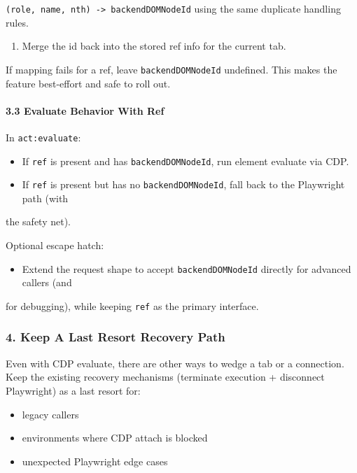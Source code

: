 \texttt{(role, name, nth) -> backendDOMNodeId} using the same duplicate handling rules.
\begin{enumerate}
  \item Merge the id back into the stored ref info for the current tab.
\end{enumerate}


If mapping fails for a ref, leave \texttt{backendDOMNodeId} undefined. This makes the feature
best-effort and safe to roll out.

\paragraph{3.3 Evaluate Behavior With Ref}


In \texttt{act:evaluate}:

\begin{itemize}
  \item If \texttt{ref} is present and has \texttt{backendDOMNodeId}, run element evaluate via CDP.
  \item If \texttt{ref} is present but has no \texttt{backendDOMNodeId}, fall back to the Playwright path (with
\end{itemize}

the safety net).

Optional escape hatch:

\begin{itemize}
  \item Extend the request shape to accept \texttt{backendDOMNodeId} directly for advanced callers (and
\end{itemize}

for debugging), while keeping \texttt{ref} as the primary interface.

\subsubsection{4. Keep A Last Resort Recovery Path}


Even with CDP evaluate, there are other ways to wedge a tab or a connection. Keep the
existing recovery mechanisms (terminate execution + disconnect Playwright) as a last resort
for:

\begin{itemize}
  \item legacy callers
  \item environments where CDP attach is blocked
  \item unexpected Playwright edge cases
\end{itemize}


